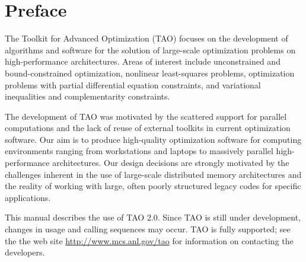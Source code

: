 
\section*{Preface}

The Toolkit for Advanced Optimization (TAO) focuses on the development
of algorithms and software for the solution of large-scale optimization 
problems on high-performance architectures.  Areas of interest include 
unconstrained and bound-constrained optimization, nonlinear least-squares 
problems, optimization problems with partial differential equation 
constraints, and variational inequalities and complementarity 
constraints.

The development of TAO was motivated by the scattered support for
parallel computations and the lack of reuse of external toolkits in
current optimization software.  Our aim is to produce high-quality 
optimization software for computing environments ranging from 
workstations and laptops to massively parallel high-performance 
architectures.  Our design decisions are strongly motivated by 
the challenges inherent in the use of large-scale distributed 
memory architectures and the reality of working with large, 
often poorly structured legacy codes for specific 
applications.

This manual describes the use of TAO 2.0.  Since TAO is still under 
development, changes in usage and calling sequences may occur.  TAO 
is fully supported; see the the web site \url{http://www.mcs.anl.gov/tao} 
for information on contacting the developers.


